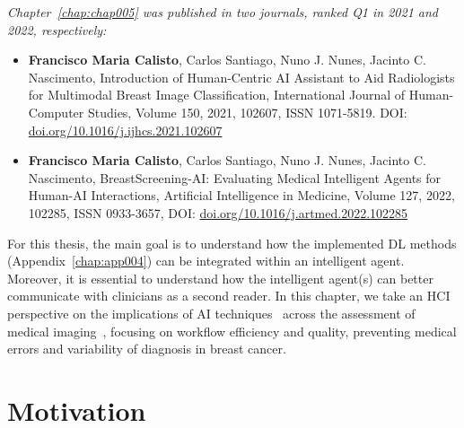 \clearpage
\label{chap:chap005}

\vspace{0.05mm}

\noindent
{\it Chapter~\ref{chap:chap005} was published in two journals, ranked Q1 in 2021 and 2022, respectively:}

\vspace{0.05mm}

\begin{itemize}
\item {\bf Francisco Maria Calisto}, Carlos Santiago, Nuno J. Nunes, Jacinto C. Nascimento, Introduction of Human-Centric AI Assistant to Aid Radiologists for Multimodal Breast Image Classification, International Journal of Human-Computer Studies, Volume 150, 2021, 102607, ISSN 1071-5819. DOI: \href{https://doi.org/10.1016/j.ijhcs.2021.102607}{doi.org/10.1016/j.ijhcs.2021.102607}
\item {\bf Francisco Maria Calisto}, Carlos Santiago, Nuno J. Nunes, Jacinto C. Nascimento, BreastScreening-AI: Evaluating Medical Intelligent Agents for Human-AI Interactions, Artificial Intelligence in Medicine, Volume 127, 2022, 102285, ISSN 0933-3657, DOI: \href{https://doi.org/10.1016/j.artmed.2022.102285}{doi.org/10.1016/j.artmed.2022.102285}
\end{itemize}

For this thesis, the main goal is to understand how the implemented \ac{DL} methods (Appendix~\ref{chap:app004}) can be integrated within an intelligent agent.
Moreover, it is essential to understand how the intelligent agent(s) can better communicate with clinicians as a second reader.
In this chapter, we take an \ac{HCI} perspective on the implications of \ac{AI} techniques~\cite{CALISTO2022102285} across the assessment of medical imaging~\cite{CALISTO2021102607}, focusing on workflow efficiency and quality, preventing medical errors and variability of diagnosis in breast cancer.

\section{Motivation}
\label{sec:chap005001}


